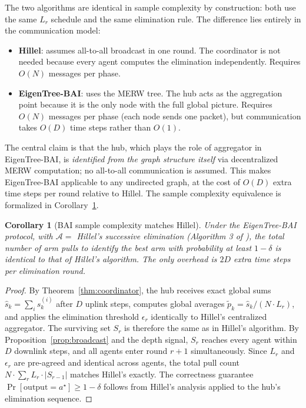 \documentclass{article}
\newtheorem{corollary}{Corollary}
\newcommand{\merw}{EigenTree}
\begin{document}
The two algorithms are identical in sample complexity by construction: both use the same $L_r$ schedule and the same elimination rule. The difference lies entirely in the communication model:

\begin{itemize}
    \item \textbf{Hillel}: assumes all-to-all broadcast in one round. The coordinator is not needed because every agent computes the elimination independently. Requires $O(N)$ messages per phase.
    \item \textbf{\merw-BAI}: uses the MERW tree. The hub acts as the aggregation point because it is the only node with the full global picture. Requires $O(N)$ messages per phase (each node sends one packet), but communication takes $O(D)$ time steps rather than $O(1)$.
\end{itemize}

The central claim is that the hub, which plays the role of aggregator in \merw-BAI, is \emph{identified from the graph structure itself} via decentralized MERW computation; no all-to-all communication is assumed. This makes \merw-BAI applicable to any undirected graph, at the cost of $O(D)$ extra time steps per round relative to Hillel. The sample complexity equivalence is formalized in Corollary~\ref{cor:bai}.

\begin{corollary}[BAI sample complexity matches Hillel]
\label{cor:bai}
Under the \merw-BAI protocol, with $\mathcal{A} = $ Hillel's successive elimination (Algorithm 3 of \citep{hillel2013distributed}), the total number of arm pulls to identify the best arm with probability at least $1-\delta$ is identical to that of Hillel's algorithm. The only overhead is $2D$ extra time steps per elimination round.
\end{corollary}

\begin{proof}
By Theorem~\ref{thm:coordinator}, the hub receives exact global sums $\hat{s}_k = \sum_i s_k^{(i)}$ after $D$ uplink steps, computes global averages $\tilde{p}_k = \hat{s}_k/(N \cdot L_r)$, and applies the elimination threshold $\epsilon_r$ identically to Hillel's centralized aggregator. The surviving set $S_r$ is therefore the same as in Hillel's algorithm. By Proposition~\ref{prop:broadcast} and the depth signal, $S_r$ reaches every agent within $D$ downlink steps, and all agents enter round $r+1$ simultaneously. Since $L_r$ and $\epsilon_r$ are pre-agreed and identical across agents, the total pull count $N \cdot \sum_r L_r \cdot |S_{r-1}|$ matches Hillel's exactly. The correctness guarantee $\Pr[\text{output} = a^\star] \geq 1-\delta$ follows from Hillel's analysis applied to the hub's elimination sequence.
\end{proof}
\end{document}
